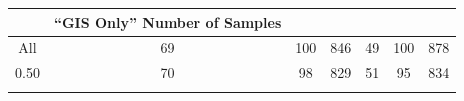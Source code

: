 \documentclass[12pt,]{article}
\begin{document}
\begin{longtable}[c]{@{}ccccccc@{}}
\begin{minipage}[b]{0.13\columnwidth}
\strut\end{minipage} &
\begin{minipage}[b]{0.13\columnwidth}\centering\strut
``GIS Only'' Number of Samples
\strut\end{minipage}\tabularnewline
\midrule
\endhead
\begin{minipage}[t]{0.08\columnwidth}\centering\strut
All
\strut\end{minipage} &
\begin{minipage}[t]{0.11\columnwidth}\centering\strut
69
\strut\end{minipage} &
\begin{minipage}[t]{0.13\columnwidth}\centering\strut
100
\strut\end{minipage} &
\begin{minipage}[t]{0.13\columnwidth}\centering\strut
846
\strut\end{minipage} &
\begin{minipage}[t]{0.11\columnwidth}\centering\strut
49
\strut\end{minipage} &
\begin{minipage}[t]{0.13\columnwidth}\centering\strut
100
\strut\end{minipage} &
\begin{minipage}[t]{0.13\columnwidth}\centering\strut
878
\strut\end{minipage}\tabularnewline
\begin{minipage}[t]{0.08\columnwidth}\centering\strut
0.50
\strut\end{minipage} &
\begin{minipage}[t]{0.11\columnwidth}\centering\strut
70
\strut\end{minipage} &
\begin{minipage}[t]{0.13\columnwidth}\centering\strut
98
\strut\end{minipage} &
\begin{minipage}[t]{0.13\columnwidth}\centering\strut
829
\strut\end{minipage} &
\begin{minipage}[t]{0.11\columnwidth}\centering\strut
51
\strut\end{minipage} &
\begin{minipage}[t]{0.13\columnwidth}\centering\strut
95
\strut\end{minipage} &
\begin{minipage}[t]{0.13\columnwidth}\centering\strut
834
\strut\end{minipage}\tabularnewline
\begin{minipage}[t]{0.08\columnwidth}\centering\strut

\end{minipage}
\end{longtable}
\end{document}
